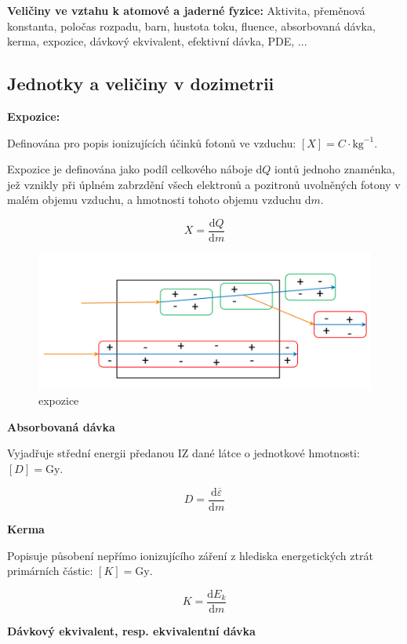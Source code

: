 \textbf{Veličiny ve vztahu k atomové a jaderné fyzice:} Aktivita, přeměnová konstanta, poločas rozpadu, barn, hustota toku, fluence, absorbovaná dávka, kerma, expozice, dávkový ekvivalent, efektivní dávka, PDE, ...

\subsection{Jednotky a veličiny v dozimetrii}

\textbf{Expozice:}

Definována pro popis ionizujících účinků fotonů ve vzduchu: $[X] = C \cdot \text{kg}^{-1}$.

Expozice je definována jako podíl celkového náboje d$Q$ iontů jednoho znaménka, jež vznikly při úplném zabrzdění všech elektronů a pozitronů uvolněných fotony v malém objemu vzduchu, a hmotnosti tohoto objemu vzduchu d$m$.

\begin{equation}
    X = \frac{\text{d}Q}{\text{d}m}
\end{equation}

\begin{figure}[H]
    \centering
    \includegraphics[width=0.5\linewidth]{img/expozice.png}
    \caption{expozice}
\end{figure}

\textbf{Absorbovaná dávka}

Vyjadřuje střední energii předanou IZ dané látce o jednotkové hmotnosti: $[D] = \text{Gy}$.

\begin{equation}
    D = \frac{\text{d}\overline{\varepsilon}}{\text{d}m}
\end{equation}

\textbf{Kerma}

Popisuje působení nepřímo ionizujícího záření z hlediska energetických ztrát primárních částic: $[K] = \text{Gy}$.

\begin{equation}
    K = \frac{\text{d}E_k}{\text{d}m}
\end{equation}

\textbf{Dávkový ekvivalent, resp. ekvivalentní dávka}

